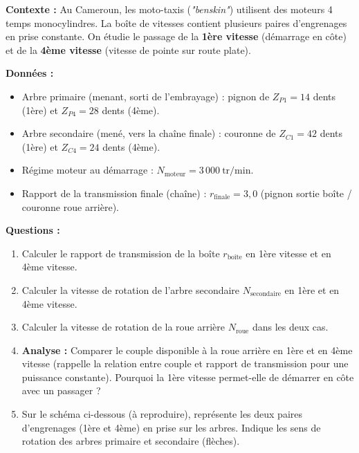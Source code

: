 \documentclass[11pt]{article}
\begin{document}
\begin{exercice}
\textbf{Contexte :} Au Cameroun, les moto-taxis (\emph{"benskin"}) utilisent des moteurs 4 temps monocylindres. La boîte de vitesses contient plusieurs paires d'engrenages en prise constante. On étudie le passage de la \textbf{1ère vitesse} (démarrage en côte) et de la \textbf{4ème vitesse} (vitesse de pointe sur route plate).

\textbf{Données :}
\begin{itemize}
    \item Arbre primaire (menant, sorti de l'embrayage) : pignon de $Z_{P1} = 14$ dents (1ère) et $Z_{P4} = 28$ dents (4ème).
    \item Arbre secondaire (mené, vers la chaîne finale) : couronne de $Z_{C1} = 42$ dents (1ère) et $Z_{C4} = 24$ dents (4ème).
    \item Régime moteur au démarrage : $N_{\text{moteur}} = 3\,000\ \text{tr/min}$.
    \item Rapport de la transmission finale (chaîne) : $r_{\text{finale}} = 3,0$ (pignon sortie boîte / couronne roue arrière).
\end{itemize}

\textbf{Questions :}
\begin{enumerate}
    \item Calculer le rapport de transmission de la boîte $r_{\text{boîte}}$ en 1ère vitesse et en 4ème vitesse.
    \item Calculer la vitesse de rotation de l'arbre secondaire $N_{\text{secondaire}}$ en 1ère et en 4ème vitesse.
    \item Calculer la vitesse de rotation de la roue arrière $N_{\text{roue}}$ dans les deux cas.
    \item \textbf{Analyse :} Comparer le couple disponible à la roue arrière en 1ère et en 4ème vitesse (rappelle la relation entre couple et rapport de transmission pour une puissance constante). Pourquoi la 1ère vitesse permet-elle de démarrer en côte avec un passager ?
    \item Sur le schéma ci-dessous (à reproduire), représente les deux paires d'engrenages (1ère et 4ème) en prise sur les arbres. Indique les sens de rotation des arbres primaire et secondaire (flèches).
\end{enumerate}
\end{exercice}
\end{document}
